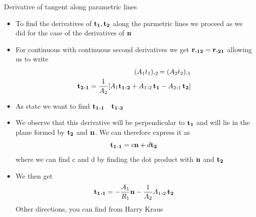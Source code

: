 	\begin{frame}{Derivative of tangent along parametric lines}
		\begin{itemize}
			\item To find the derivatives of $\mathbf{t_1,t_2}$ along the parmetric lines we proceed as we did for the case of the derivatives of $\mathbf{n}$
			\item For continuous with continuous second derivatives we get $\mathbf{r,_{12} }= \mathbf{r,_{21} }$ allowing us to write
			\begin{equation}
			\begin{aligned}
				(A_1t_1),_2 = (A_2t_2),_1 \\
				\mathbf{t_2,_1} = \frac{1}{A_2} [A_1\mathbf{t_1,_2} 
				+ A_1,_2\mathbf{t_1} - A_2,_1\mathbf{t_2}]
			\end{aligned}
			\end{equation}
			\item As state we want to find $\mathbf{t_1,_1} \quad \mathbf{t_1,_2}$
			\item We observe that this derivative will be perpendicular to $\mathbf{t_1}$ and will lie in the plane formed by $\mathbf{t_2}$ and $\mathbf{n}$. We can therefore express it as 
			\begin{equation}
			  \mathbf{t_1,_1} = c \mathbf{n} + d \mathbf{t_2}
			\end{equation}
			where we can find c and d by finding the dot product with $\mathbf{n}$ and $\mathbf{t_2}$
			\item We then get
			\begin{equation}
			\begin{aligned}
				\mathbf{t_1,_1} = -\frac{ A_1}{R_1}\mathbf{n} - \frac{1}{A_2}A_1,_2 \mathbf{t_2}
			\end{aligned}
			\end{equation}
			Other directions, you can find from Harry Kraus
		\end{itemize}
	\end{frame}

